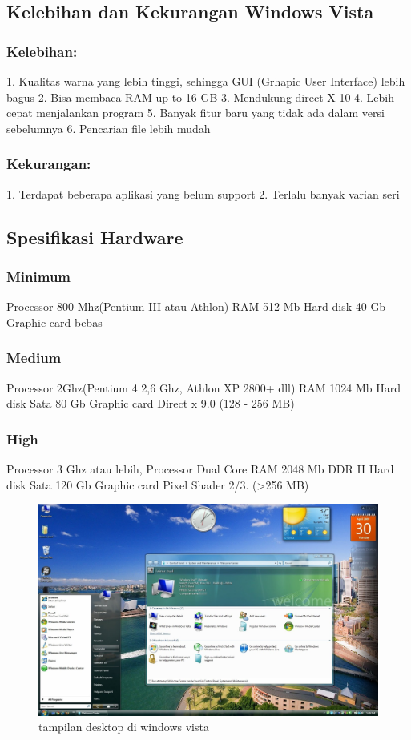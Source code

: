 	\subsection{Kelebihan dan Kekurangan Windows Vista}  \cite{russinovich2009windows}
		\subsubsection{Kelebihan:}
			1. Kualitas warna yang lebih tinggi, sehingga GUI (Grhapic User Interface) lebih bagus
			2. Bisa membaca RAM up to 16 GB
			3. Mendukung direct X 10
			4. Lebih cepat menjalankan program
			5. Banyak fitur baru yang tidak ada dalam versi sebelumnya
			6. Pencarian file lebih mudah 
		\subsubsection{Kekurangan:}
			1. Terdapat beberapa aplikasi yang belum support
			2. Terlalu banyak varian seri
	\subsection{Spesifikasi Hardware}
		\subsubsection{Minimum}
			Processor 800 Mhz(Pentium III atau Athlon)
			RAM 512 Mb
			Hard disk 40 Gb
			Graphic card bebas
		\subsubsection{Medium}
			Processor 2Ghz(Pentium 4 2,6 Ghz, Athlon XP 2800+ dll)
			RAM 1024 Mb
			Hard disk Sata 80 Gb
			Graphic card Direct x 9.0 (128 - 256 MB)
		\subsubsection{High}
			Processor 3 Ghz atau lebih, Processor Dual Core
			RAM 2048 Mb DDR II
			Hard disk Sata 120 Gb
			Graphic card Pixel Shader 2/3. (>256 MB)


\begin{figure}[ht]
\centerline{\includegraphics[width=1\textwidth]{figures/vista1.JPG}}
\caption{tampilan desktop di windows vista}
\label{vista1}
\end{figure}


